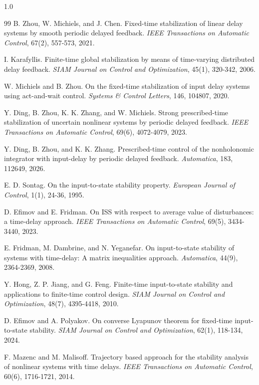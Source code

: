\documentclass[journal]{IEEEtran}
\begin{document}
\begin{spacing}{1.0}
\begin{thebibliography}{99}
B. Zhou, W. Michiels, and J. Chen. Fixed-time
stabilization of linear delay systems by smooth periodic delayed feedback.
\textit{IEEE Transactions on Automatic Control}, 67(2), 557-573, 2021.

I. Karafyllis. Finite-time global stabilization by means
of time-varying distributed delay feedback. \textit{SIAM Journal on Control
and Optimization}, 45(1), 320-342, 2006.

W. Michiels and B. Zhou. On the fixed-time
stabilization of input delay systems using act-and-wait control.
\textit{Systems \& Control Letters}, 146, 104807, 2020.

Y. Ding, B. Zhou, K. K. Zhang, and W. Michiels. Strong
prescribed-time stabilization of uncertain nonlinear systems by periodic
delayed feedback. \textit{IEEE Transactions on Automatic Control}, 69(6),
4072-4079, 2023.

Y. Ding, B. Zhou, and K. K. Zhang. Prescribed-time
control of the nonholonomic integrator with input-delay by periodic delayed
feedback. \textit{Automatica}, 183, 112649, 2026.

E. D. Sontag. On the input-to-state stability property.
\textit{European Journal of Control}, 1(1), 24-36, 1995.

D. Efimov and E. Fridman. On ISS with respect to average
value of disturbances: a time-delay approach. \textit{IEEE Transactions on
Automatic Control}, 69(5), 3434-3440, 2023.

E. Fridman, M. Dambrine, and N. Yeganefar. On
input-to-state stability of systems with time-delay: A matrix inequalities
approach. \textit{Automatica}, 44(9), 2364-2369, 2008.

Y. Hong, Z. P. Jiang, and G. Feng. Finite-time
input-to-state stability and applications to finite-time control design.
\textit{SIAM Journal on Control and Optimization}, 48(7), 4395-4418, 2010.

D. Efimov and A. Polyakov. On converse Lyapunov theorem
for fixed-time input-to-state stability. \textit{SIAM Journal on Control and
Optimization}, 62(1), 118-134, 2024.

F. Mazenc and M. Malisoff. Trajectory based approach for
the stability analysis of nonlinear systems with time delays. \textit{IEEE
Transactions on Automatic Control}, 60(6), 1716-1721, 2014.


\end{thebibliography}
\end{spacing}
\end{document}
